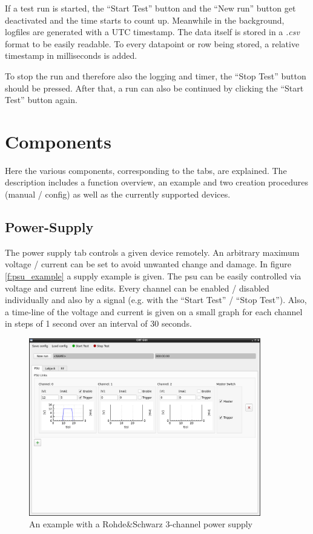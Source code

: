 \documentclass[10pt,a4paper]{article}
\begin{document}
	If a test run is started, the \enquote{Start Test} button and the \enquote{New run} button get deactivated and the time starts to count up. Meanwhile in the background, logfiles are generated with a UTC timestamp. The data itself is stored in a \textit{.csv} format to be easily readable. To every datapoint or row being stored, a relative timestamp in milliseconds is added.
	
	\bigbreak
	
	To stop the run and therefore also the logging and timer, the \enquote{Stop Test} button should be pressed. After that, a run can also be continued by clicking the \enquote{Start Test} button again.	
	
\newpage
	
\section{Components}
Here the various components, corresponding to the tabs, are explained. The description includes a function overview, an example and two creation procedures (manual / config) as well as the currently supported devices.

	\subsection{Power-Supply}
	The power supply tab controls a given device remotely. An arbitrary maximum voltage / current can be set to avoid unwanted change and damage. In figure \eqref{f:psu_example} a supply example is given. The psu can be easily controlled via voltage and current line edits. Every channel can be enabled / disabled individually and also by a signal (e.g. with the \enquote{Start Test} / \enquote{Stop Test}). Also, a time-line of the voltage and current is given on a small graph for each channel in steps of 1 second over an interval of 30 seconds. 	
	
	\begin{figure}[H]
\centering
\includegraphics[width=0.9\textwidth]{./2_PSU_example.png}
\caption{An example with a Rohde\&Schwarz 3-channel power supply}
\label{f:psu_example}
	\end{figure}	 
	
\end{document}
